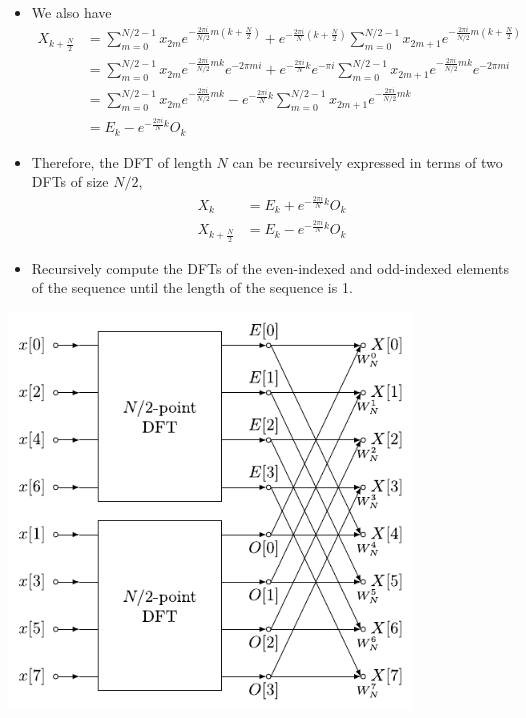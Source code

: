 \documentclass{beamer}
\newcommand{\beforeverb}{\footnotesize}
\newcommand{\afterverb}{\normalsize}
\begin{document}
\begin{frame}
\begin{itemize}
    \item We also have 
    \beforeverb 
        \begin{align*}
            X_{k+\frac{N}{2}} & =\sum_{m=0}^{N / 2-1} x_{2 m} e^{-\frac{2 \pi i}{N / 2} m\left(k+\frac{N}{2}\right)}+e^{-\frac{2 \pi i}{N}\left(k+\frac{N}{2}\right)} \sum_{m=0}^{N / 2-1} x_{2 m+1} e^{-\frac{2 \pi i}{N / 2} m\left(k+\frac{N}{2}\right)} \\
            & =\sum_{m=0}^{N / 2-1} x_{2 m} e^{-\frac{2 \pi i}{N / 2} m k} e^{-2 \pi m i}+e^{-\frac{2 \pi i}{N} k} e^{-\pi i} \sum_{m=0}^{N / 2-1} x_{2 m+1} e^{-\frac{2 \pi i}{N / 2} m k} e^{-2 \pi m i} \\
            & =\sum_{m=0}^{N / 2-1} x_{2 m} e^{-\frac{2 \pi i}{N / 2} m k}-e^{-\frac{2 \pi i}{N} k} \sum_{m=0}^{N / 2-1} x_{2 m+1} e^{-\frac{2 \pi i}{N / 2} m k} \\
            & =E_k-e^{-\frac{2 \pi i}{N} k} O_k
        \end{align*}
    \afterverb
   
    \item Therefore, the DFT of length $N$ can be recursively expressed in terms of two DFTs of size $N/2$,
    \begin{align*}
        X_k & =E_k+e^{-\frac{2 \pi i}{N} k} O_k \\
        X_{k+\frac{N}{2}} & =E_k-e^{-\frac{2 \pi i}{N} k} O_k
        \end{align*}
    \item Recursively compute the DFTs of the even-indexed and odd-indexed elements of the sequence until the length of the sequence is 1.
\end{itemize}
\end{frame}
\begin{frame}
\centerline{\includegraphics[width=0.8\textwidth]{DIT-FFT-butterfly.pdf}}
\end{frame}
\end{document}

